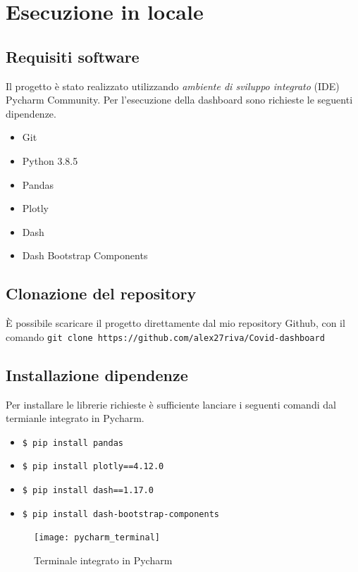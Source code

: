 
\section{Esecuzione in locale}

\subsection{Requisiti software}
Il progetto è stato realizzato utilizzando \emph{ambiente di sviluppo integrato} (IDE) Pycharm Community.
Per l'esecuzione della dashboard sono richieste le seguenti dipendenze.
\enlargethispage{\baselineskip}
\begin{itemize}
 \item Git
 \item Python 3.8.5
 \item Pandas
 \item Plotly 
 \item Dash 
 \item Dash Bootstrap Components
 \end{itemize}

 \subsection{Clonazione del repository}
 È possibile scaricare il progetto direttamente dal mio repository Github, con il comando \texttt{git clone https://github.com/alex27riva/Covid-dashboard}
 
 \subsection{Installazione dipendenze}
 Per installare le librerie richieste è sufficiente lanciare i seguenti comandi dal termianle integrato in Pycharm.
 
 \begin{itemize}
     \item \texttt{\$ pip install pandas}
     \item \texttt{\$ pip install plotly==4.12.0}
     \item \texttt{\$ pip install dash==1.17.0}
     \item \texttt{\$ pip install dash-bootstrap-components}
 \end{itemize}
 
 \begin{figure}[htp]
    \centering
    \texttt{[image: pycharm\_terminal]}
    \caption{Terminale integrato in Pycharm}
    \label{fig:pycharm_termianl}
\end{figure}

